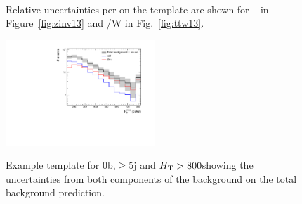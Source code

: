 \begin{figure}[h!]
  \centering
  ~~
  \\
  \caption{\label{fig:expected13} Relative uncertainties per \GeV on the template are shown for \zInv~ in Figure~\ref{fig:zinv13} 
  and \ttbar/W in Fig.~\ref{fig:ttw13}.}
  
\end{figure}

\begin{figure}[h!]
  \centering
  \includegraphics[width=0.5\textwidth]{figures/template/exampleTemplate13TeV.pdf}
  \\
  \caption{\label{fig:exampleTemplate13} Example template for 0b,$\ge5$j and $\mbox{$H_\text{T}$} > 800$\GeV showing the uncertainties from both
components of the background on the total background prediction.}
  
\end{figure}
